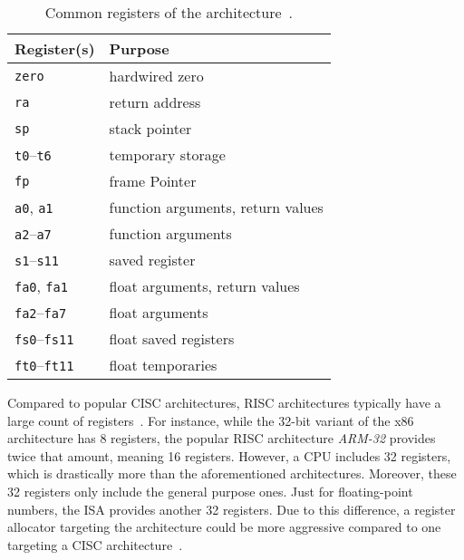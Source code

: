 \begin{wraptable}{r}{.4\textwidth}
	\centering
	\caption[Common registers of the \riscv{} architecture.]{Common registers of the \riscv{} architecture~\cite[p.~155]{Waterman2019}.}\label{tbl:riscv_regs}
	\begin{tabularx}{\linewidth}{l|L}
		 Register(s) & Purpose                           \\ \hline
		\texttt{zero}                  & hardwired zero                    \\ \hline
		\texttt{ra}                    & return address                    \\ \hline
		\texttt{sp}                    & stack pointer                     \\ \hline
		\texttt{t0}--\texttt{t6}       & temporary storage                 \\ \hline
		\texttt{fp}                    & frame Pointer                     \\ \hline
		\texttt{a0}, \texttt{a1}       & function arguments, return values \\ \hline
		\texttt{a2}--\texttt{a7}       & function arguments                \\ \hline
		\texttt{s1}--\texttt{s11}      & saved register                    \\ \hline
		\texttt{fa0}, \texttt{fa1}     & float arguments, return values    \\ \hline
		\texttt{fa2}--\texttt{fa7}     & float arguments                   \\ \hline
		\texttt{fs0}--\texttt{fs11}    & float saved registers             \\ \hline
		\texttt{ft0}--\texttt{ft11}    & float temporaries                 \\
	\end{tabularx}
\end{wraptable}

Compared to popular CISC architectures, RISC architectures typically have a large count of registers~\cite[Chapter~2]{Dandamudi2005}.
For instance, while the 32-bit variant of the x86 architecture has 8 registers,
the popular RISC architecture \emph{ARM-32} provides twice that amount, meaning 16 registers.
However, a \riscv{} CPU includes 32 registers, which is drastically more than the aforementioned architectures.
Moreover, these 32 registers only include the general purpose ones.
Just for floating-point numbers, the ISA provides another 32 registers.
Due to this difference, a register allocator targeting the \riscv{} architecture could be more aggressive compared to one targeting a CISC architecture~\cite[p.~10]{Patterson2017}.

